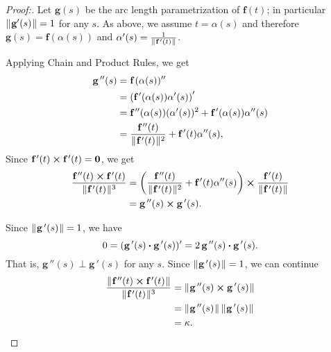 \begin{proofbar}
\begin{proof}[Proof:]
Let $\textbf{g}(s)$ be the arc length parametrization of $\textbf{f}(t)$; in particular $\lVert\mspace{1mu}\textbf{g}'(s)\mspace{1mu}\rVert=1$ for any $s$.
As above, we assume $t=\alpha(s)$ and therefore  $\textbf{g}(s)=\textbf{f}(\alpha(s))$ and $\alpha'(s)=\frac{1}{\lVert\mspace{1mu}\textbf{f}\,'(t)\mspace{1mu}\rVert}$.

Applying Chain and Product Rules, we get
\begin{align*}
\textbf{g}\,''(s)&=\textbf{f}\,(\alpha(s))''
\\
&=\left(\textbf{f}\,'(\alpha(s))\alpha'(s)\right)'
\\
&=\textbf{f}\,''(\alpha(s))(\alpha'(s))^2+\textbf{f}\,'(\alpha(s))\alpha''(s)
\\
&=\frac{\textbf{f}\,''(t)}{\lVert\mspace{1mu}\textbf{f}\,'(t)\mspace{1mu}\rVert^2}+\textbf{f}\,'(t)\alpha''(s),
\end{align*}
Since $\textbf{f}\,'(t) \bm{\times} \textbf{f}\,'(t)=\textbf{0}$,
we get
\begin{align*}
\frac{\textbf{f}\,''(t) \bm{\times} \textbf{f}\,'(t)}{\lVert\mspace{1mu}\textbf{f}\,'(t)\mspace{1mu}\rVert^3}
&=
\left(\frac{\textbf{f}\,''(t)}{\lVert\mspace{1mu}\textbf{f}\,'(t)\mspace{1mu}\rVert^2}+\textbf{f}\,'(t)\alpha''(s)\right) \bm{\times} \frac{\textbf{f}\,'(t)}{\lVert\mspace{1mu}\textbf{f}\,'(t)\mspace{1mu}\rVert}
\\
&=
\textbf{g}\,''(s) \bm{\times} \textbf{g}\,'(s).
\end{align*}

Since $\lVert\mspace{1mu}\textbf{g}\,'(s)\mspace{1mu}\rVert=1$, we have
\[0=(\textbf{g}\,'(s) \bm{\cdot} \textbf{g}\,'(s))'=2\,\textbf{g}\,''(s) \bm{\cdot} \textbf{g}\,'(s).\]
That is, $\textbf{g}\,''(s)\perp\textbf{g}\,'(s)$ for any $s$.  Since $\lVert\mspace{1mu}\textbf{g}\,'(s)\mspace{1mu}\rVert=1$, we can continue
\begin{align*}
\frac{\lVert\mspace{1mu}\textbf{f}\,''(t) \bm{\times} \textbf{f}\,'(t)\mspace{1mu}\rVert}{\lVert\mspace{1mu}\textbf{f}\,'(t)\mspace{1mu}\rVert^3}
&=
\lVert\mspace{1mu}\textbf{g}\,''(s) \bm{\times} \textbf{g}\,'(s)\mspace{1mu}\rVert
\\
&=\lVert\mspace{1mu}\textbf{g}\,''(s)\mspace{1mu}\rVert\,\lVert\mspace{1mu}\textbf{g}\,'(s)\mspace{1mu}\rVert
\\
&=\kappa.
\end{align*}
\end{proof}\end{proofbar}

